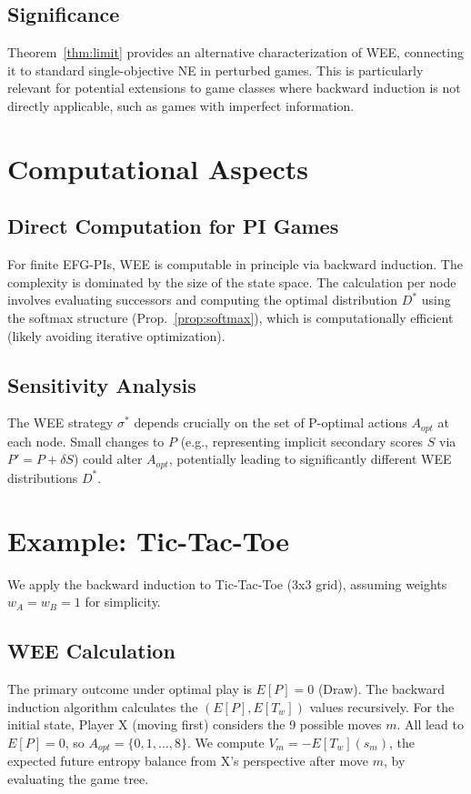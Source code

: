 \documentclass{article}
\begin{document}
\subsection{Significance}
Theorem~\ref{thm:limit} provides an alternative characterization of WEE, connecting it to standard single-objective NE in perturbed games. This is particularly relevant for potential extensions to game classes where backward induction is not directly applicable, such as games with imperfect information.

\section{Computational Aspects}

\subsection{Direct Computation for PI Games}
For finite EFG-PIs, WEE is computable in principle via backward induction. The complexity is dominated by the size of the state space. The calculation per node involves evaluating successors and computing the optimal distribution $D^*$ using the softmax structure (Prop.~\ref{prop:softmax}), which is computationally efficient (likely avoiding iterative optimization).

\subsection{Sensitivity Analysis}
The WEE strategy $\sigma^*$ depends crucially on the set of P-optimal actions $A_{opt}$ at each node. Small changes to $P$ (e.g., representing implicit secondary scores $S$ via $P' = P + \delta S$) could alter $A_{opt}$, potentially leading to significantly different WEE distributions $D^*$.

\section{Example: Tic-Tac-Toe}

We apply the backward induction to Tic-Tac-Toe (3x3 grid), assuming weights $w_A = w_B = 1$ for simplicity.

\subsection{WEE Calculation}
The primary outcome under optimal play is $E[P]=0$ (Draw). The backward induction algorithm calculates the $(E[P], E[T_w])$ values recursively. For the initial state, Player X (moving first) considers the 9 possible moves $m$. All lead to $E[P]=0$, so $A_{opt} = \{0, 1, \dots, 8\}$. We compute $V_m = -E[T_w](s_m)$, the expected future entropy balance from X's perspective after move $m$, by evaluating the game tree.
\end{document}
